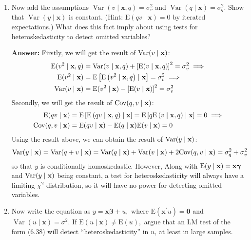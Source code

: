 \begin{enumerate}
\begin{enumerate}
        \item Now add the assumptions $\operatorname{Var}(v \mid \mathbf{x}, q)=\sigma_{v}^{2}$ and $\operatorname{Var}(q \mid \mathbf{x})=\sigma_{q}^{2}$. Show that $\operatorname{Var}(y \mid \mathbf{x})$ is constant. (Hint: $\mathrm{E}(q v \mid \mathbf{x})=0$ by iterated expectations.) What does this fact imply about using tests for heteroskedasticity to detect omitted variables?
        
        \textbf{Answer:} Firstly, we will get the result of $\mathrm{Var}(v\mid \mathbf{x})$: 
        \begin{align*}
            \mathrm{E}(v^2\mid \mathbf{x},q) &= \mathrm{Var}(v\mid \mathbf{x},q) + \left[ \mathrm{E}(v\mid \mathbf{x},q) \right]^2 = \sigma^2_v \implies \\
            \mathrm{E}(v^2\mid \mathbf{x}) &= \mathrm{E}\left[ \mathrm{E}\left( v^2\mid \mathbf{x},q \right)\mid \mathbf{x} \right] = \sigma^2_v \implies \\
            \mathrm{Var}(v\mid \mathbf{x}) &= \mathrm{E}(v^2\mid \mathbf{x}) - \left[ \mathrm{E}(v\mid \mathbf{x}) \right]^2 = \sigma^2_v
        \end{align*}
        Secondly, we will get the result of $\mathrm{Cov}(q,v\mid \mathbf{x})$:
        \begin{align*}
            \mathrm{E}(qv\mid \mathbf{x}) &= \mathrm{E}\left[ \mathrm{E}\left( qv\mid \mathbf{x},q \right)\mid \mathbf{x} \right] = \mathrm{E}\left[ q \mathrm{E} \left( v\mid \mathbf{x},q \right)\mid \mathbf{x} \right] = 0 \implies \\
            \mathrm{Cov}(q,v\mid \mathbf{x}) &= \mathrm{E}(qv\mid \mathbf{x}) - \mathrm{E}(q\mid \mathbf{x}) \mathrm{E}(v\mid \mathbf{x}) = 0
        \end{align*}
        Using the result above, we can obtain the result of $\mathrm{Var}(y\mid \mathbf{x})$: 
        \[ \mathrm{Var}(y\mid \mathbf{x}) = \mathrm{Var}(q+v\mid \mathbf{x}) = \mathrm{Var}(q\mid \mathbf{x}) + \mathrm{Var}(v\mid \mathbf{x}) + 2\mathrm{Cov}(q,v\mid \mathbf{x}) = \sigma^2_q + \sigma^2_v \]
        so that $y$ is conditionally homoskedastic. However, Along with $\mathrm{E}(y\mid \mathbf{x}) = \mathbf{x}\bm{\gamma}$ and $\mathrm{Var}(y\mid \mathbf{x})$ being constant, a test for heteroskedasticity will always have a limiting $\chi^2$ distribution, so it will have no power for detecting omitted variables.
        
        \item Now write the equation as $y=\mathbf{x} \boldsymbol{\beta}+u,$ where $\mathrm{E}\left(\mathbf{x}^{\prime} u\right)=\mathbf{0}$ and $\operatorname{Var}(u \mid  \mathbf{x})=\sigma^{2}$. If $\mathrm{E}(u \mid  \mathbf{x}) \neq \mathrm{E}(u),$ argue that an $\mathrm{LM}$ test of the form (6.38) will detect ``heteroskedasticity'' in $u$, at least in large samples.
        

\end{enumerate}
\end{enumerate}
